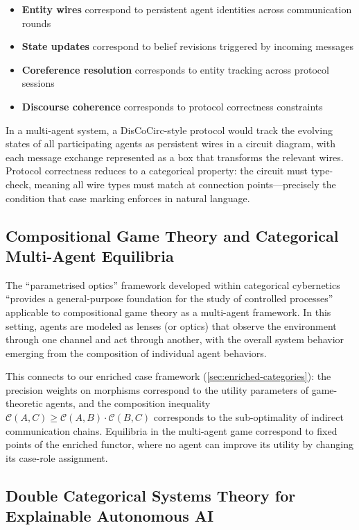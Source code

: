 \documentclass[
]{article}
\providecommand{\tightlist}{%
  \setlength{\itemsep}{0pt}\setlength{\parskip}{0pt}}
\numberwithin{equation}{section}
\begin{document}
\begin{itemize}
\tightlist
\item
  \textbf{Entity wires} correspond to persistent agent identities across
  communication rounds
\item
  \textbf{State updates} correspond to belief revisions triggered by
  incoming messages
\item
  \textbf{Coreference resolution} corresponds to entity tracking across
  protocol sessions
\item
  \textbf{Discourse coherence} corresponds to protocol correctness
  constraints
\end{itemize}

In a multi-agent system, a DisCoCirc-style protocol would track the
evolving states of all participating agents as persistent wires in a
circuit diagram, with each message exchange represented as a box that
transforms the relevant wires. Protocol correctness reduces to a
categorical property: the circuit must type-check, meaning all wire
types must match at connection points---precisely the condition that
case marking enforces in natural language.

\subsection{Compositional Game Theory and Categorical Multi-Agent
Equilibria}\label{compositional-game-theory-and-categorical-multi-agent-equilibria}

The ``parametrised optics'' framework developed within categorical
cybernetics ``provides a general-purpose foundation for the study of
controlled processes'' applicable to compositional game theory as a
multi-agent framework. In this setting, agents are modeled as lenses (or
optics) that observe the environment through one channel and act through
another, with the overall system behavior emerging from the composition
of individual agent behaviors.

This connects to our enriched case framework
(\autoref{sec:enriched-categories}): the precision weights on morphisms
correspond to the utility parameters of game-theoretic agents, and the
composition inequality
\(\mathcal{C}(A,C) \geq \mathcal{C}(A,B) \cdot \mathcal{C}(B,C)\)
corresponds to the sub-optimality of indirect communication chains.
Equilibria in the multi-agent game correspond to fixed points of the
enriched functor, where no agent can improve its utility by changing its
case-role assignment.

\subsection{Double Categorical Systems Theory for Explainable Autonomous
AI}\label{double-categorical-systems-theory-for-explainable-autonomous-ai}
\end{document}
